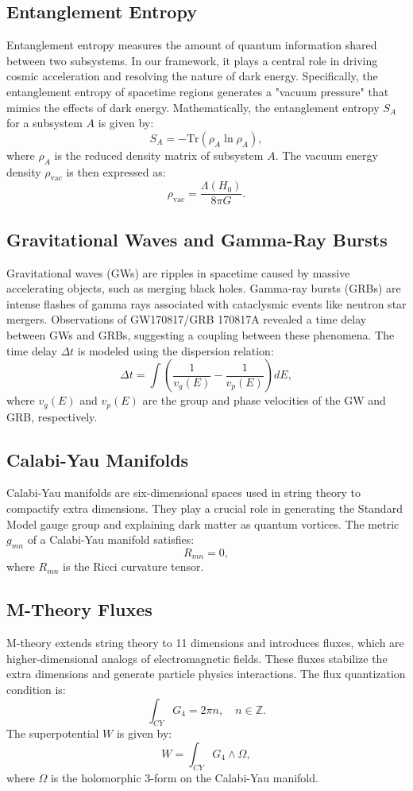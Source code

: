\documentclass[12pt,a4paper]{article}
\begin{document}
\subsection{Entanglement Entropy}
Entanglement entropy measures the amount of quantum information shared between two subsystems. In our framework, it plays a central role in driving cosmic acceleration and resolving the nature of dark energy. Specifically, the entanglement entropy of spacetime regions generates a "vacuum pressure" that mimics the effects of dark energy. Mathematically, the entanglement entropy $S_A$ for a subsystem $A$ is given by:
\[
S_A = -\text{Tr}(\rho_A \ln \rho_A),
\]
where $\rho_A$ is the reduced density matrix of subsystem $A$. The vacuum energy density $\rho_{\text{vac}}$ is then expressed as:
\[
\rho_{\text{vac}} = \frac{\Lambda(H_0)}{8\pi G}.
\]

\subsection{Gravitational Waves and Gamma-Ray Bursts}
Gravitational waves (GWs) are ripples in spacetime caused by massive accelerating objects, such as merging black holes. Gamma-ray bursts (GRBs) are intense flashes of gamma rays associated with cataclysmic events like neutron star mergers. Observations of GW170817/GRB 170817A revealed a time delay between GWs and GRBs, suggesting a coupling between these phenomena. The time delay $\Delta t$ is modeled using the dispersion relation:
\[
\Delta t = \int \left( \frac{1}{v_g(E)} - \frac{1}{v_p(E)} \right) dE,
\]
where $v_g(E)$ and $v_p(E)$ are the group and phase velocities of the GW and GRB, respectively.

\subsection{Calabi-Yau Manifolds}
Calabi-Yau manifolds are six-dimensional spaces used in string theory to compactify extra dimensions. They play a crucial role in generating the Standard Model gauge group and explaining dark matter as quantum vortices. The metric $g_{mn}$ of a Calabi-Yau manifold satisfies:
\[
R_{mn} = 0,
\]
where $R_{mn}$ is the Ricci curvature tensor.

\subsection{M-Theory Fluxes}
M-theory extends string theory to 11 dimensions and introduces fluxes, which are higher-dimensional analogs of electromagnetic fields. These fluxes stabilize the extra dimensions and generate particle physics interactions. The flux quantization condition is:
\[
\int_{CY} G_4 = 2\pi n, \quad n \in \mathbb{Z}.
\]
The superpotential $W$ is given by:
\[
W = \int_{CY} G_4 \wedge \Omega,
\]
where $\Omega$ is the holomorphic 3-form on the Calabi-Yau manifold.
\end{document}
